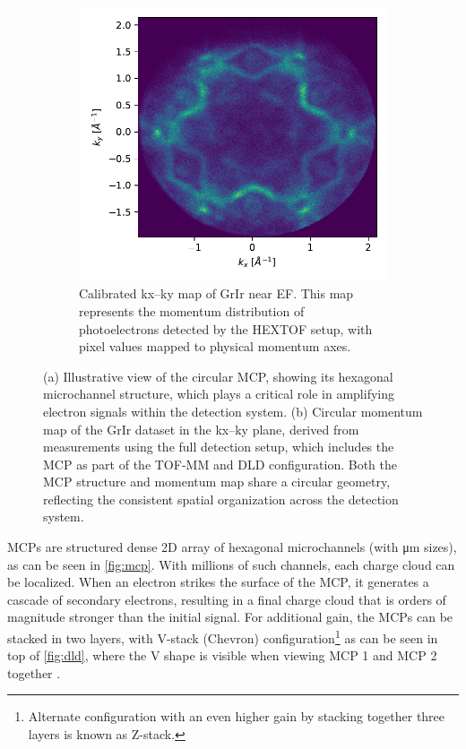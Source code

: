 \begin{figure}[h]
\begin{subfigure}[t]{0.49\linewidth}
        \includegraphics[width=\linewidth]{images/calibrated_momentum.pdf}
        \caption{Calibrated \gls{kx}--\gls{ky} map of \gls{GrIr} near \gls{EF}. This map represents the momentum distribution of photoelectrons detected by the \gls{HEXTOF} setup, with pixel values mapped to physical momentum axes.}
        \label{fig:grir-2d-slice-calibrated}
    \end{subfigure}
    \caption{(a) Illustrative view of the circular \gls{MCP}, showing its hexagonal microchannel structure, which plays a critical role in amplifying electron signals within the detection system. (b) Circular momentum map of the \gls{GrIr} dataset in the \gls{kx}--\gls{ky} plane, derived from measurements using the full detection setup, which includes the \gls{MCP} as part of the \gls{TOF}-\gls{MM} and \gls{DLD} configuration. Both the MCP structure and momentum map share a circular geometry, reflecting the consistent spatial organization across the detection system.}
    \label{fig:combined-figures}
\end{figure}

\Glspl{MCP} are structured dense 2D array of hexagonal microchannels (with \unit{\micro\meter} sizes), as can be seen in \cref{fig:mcp}. With millions of such channels, each charge cloud can be localized. When an electron strikes the surface of the \gls{MCP}, it generates a cascade of secondary electrons, resulting in a final charge cloud that is orders of magnitude stronger than the initial signal. For additional gain, the \glspl{MCP} can be stacked in two layers, with V-stack (Chevron) configuration\footnote{Alternate configuration with an even higher gain by stacking together three layers is known as Z-stack.}
as can be seen in top of \cref{fig:dld}, where the V shape is visible when viewing MCP 1 and MCP 2 together \cite{ladislaswizaMicrochannelPlateDetectors1979,paschottaMicrochannelPlatesEncyclopedia2019}. 

